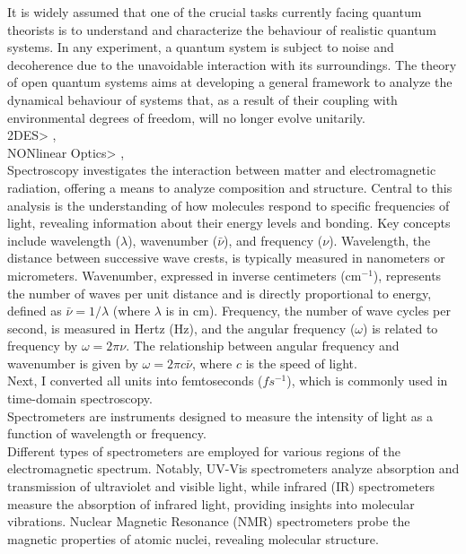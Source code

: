 It is widely assumed that one of the crucial tasks currently facing quantum theorists
is to understand and characterize the behaviour of realistic quantum systems. In
any experiment, a quantum system is subject to noise and decoherence due to the
unavoidable interaction with its surroundings. The theory of open quantum systems
aims at developing a general framework to analyze the dynamical behaviour of systems
that, as a result of their coupling with environmental degrees of freedom, will no
longer evolve unitarily. \cite{RivasEtAl2010MarkovianMasterEquations}
\\
2DES> %
\cite{Segarra-MartiEtAl2018AccurateSimulationTwoDimensional}, \cite{SunEtAl2024TwodimensionalSpectroscopyOpen}
\\
NONlinear Optics> \cite{Hamm2005PrinciplesNonlinearOptical}, \cite{Mukamel1995PrinciplesNonlinearOptical}
\\
Spectroscopy investigates the interaction between matter and electromagnetic radiation, offering a means to analyze composition and structure.
Central to this analysis is the understanding of how molecules respond to specific frequencies of light, revealing information about their energy levels and bonding.
Key concepts include wavelength ($\lambda$), wavenumber ($\bar{\nu}$), and frequency ($\nu$).
Wavelength, the distance between successive wave crests, is typically measured in nanometers or micrometers.
Wavenumber, expressed in inverse centimeters (cm$^{-1}$), represents the number of waves per unit distance and is directly proportional to energy, defined as $\bar{\nu} = 1/\lambda$ (where $\lambda$ is in cm).
Frequency, the number of wave cycles per second, is measured in Hertz (Hz), and the angular frequency ($\omega$) is related to frequency by $\omega = 2\pi\nu$.
The relationship between angular frequency and wavenumber is given by $\omega = 2\pi c \bar{\nu}$, where $c$ is the speed of light.\\
Next, I converted all units into femtoseconds ($fs^{-1}$), which is commonly used in time-domain spectroscopy.\\
Spectrometers are instruments designed to measure the intensity of light as a function of wavelength or frequency.\\
Different types of spectrometers are employed for various regions of the electromagnetic spectrum.
Notably, UV-Vis spectrometers analyze absorption and transmission of ultraviolet and visible light, while infrared (IR) spectrometers measure the absorption of infrared light, providing insights into molecular vibrations.
Nuclear Magnetic Resonance (NMR) spectrometers probe the magnetic properties of atomic nuclei, revealing molecular structure.
